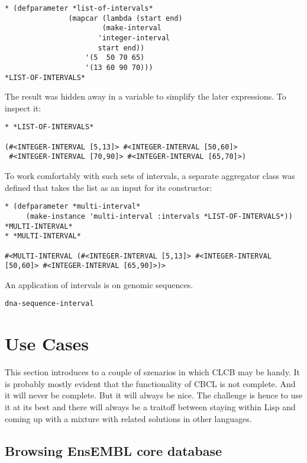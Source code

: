 \documentclass{book}
\newcommand\ensembl{EnsEMBL }
\newcommand\CLCB{CLCB }
\begin{document}
\begin{lstlisting}
* (defparameter *list-of-intervals*
               (mapcar (lambda (start end)
		               (make-interval
			          'integer-interval
			          start end))
	               '(5  50 70 65)
           	       '(13 60 90 70)))
*LIST-OF-INTERVALS*
\end{lstlisting}

The result was hidden away in a variable to simplify
the later expressions. To inspect it:

\begin{lstlisting}
* *LIST-OF-INTERVALS*

(#<INTEGER-INTERVAL [5,13]> #<INTEGER-INTERVAL [50,60]>
 #<INTEGER-INTERVAL [70,90]> #<INTEGER-INTERVAL [65,70]>)
\end{lstlisting}

To work comfortably with such sets of intervals, a separate
aggregator class was defined that takes the list as an input
for its constructor:

\begin{lstlisting}
* (defparameter *multi-interval*
     (make-instance 'multi-interval :intervals *LIST-OF-INTERVALS*))
*MULTI-INTERVAL*
* *MULTI-INTERVAL*

#<MULTI-INTERVAL (#<INTEGER-INTERVAL [5,13]> #<INTEGER-INTERVAL [50,60]> #<INTEGER-INTERVAL [65,90]>)>

\end{lstlisting}

An application of intervals is on genomic sequences. 

\begin{lstlisting}
dna-sequence-interval
\end{lstlisting}



\chapter{Use Cases}

This section introduces to a couple of szenarios in which \CLCB may
be handy. It is probably mostly evident that the functionality of CBCL
is not complete. And it will never be complete. But it will always be
nice. The challenge is hence to use it at its best and there will always
be a traitoff between staying within Lisp and coming up with a mixture
with related solutions in other languages.

\section{Browsing \ensembl core database}
\end{document}
